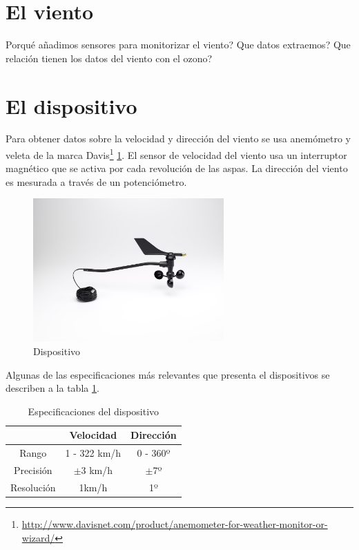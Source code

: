 \documentclass[a4paper, 11pt]{article}
\begin{document}
\section{El viento}
Porqué añadimos sensores para monitorizar el viento?
Que datos extraemos?
Que relación tienen los datos del viento con el ozono?

\newpage
\section{El dispositivo}
Para obtener datos sobre la velocidad y dirección del viento se usa anemómetro y veleta de la marca Davis\footnote{\url{http://www.davisnet.com/product/anemometer-for-weather-monitor-or-wizard/}} \ref{fig:gadget}. El sensor de velocidad del viento usa un interruptor magnético que se activa por cada revolución de las aspas. La dirección del viento es mesurada a través de un potenciómetro.

\begin{figure}[h]
	\center
	\includegraphics[width=0.65\textwidth]{img/davis.jpg}
	\caption{Dispositivo}
	\label{fig:gadget}
\end{figure}

Algunas de las especificaciones más relevantes que presenta el dispositivos se describen a la tabla 	\ref{tab:specifications}.

\begin{table}[h]
\center
\begin{tabular}{| c | c | c |}
\hline
& \textbf{Velocidad} & \textbf{Dirección} \\
\hline
Rango & 1 - 322 km/h & 0 - 360º \\
\hline
Precisión & $\pm$3 km/h & $\pm$7º \\
\hline
Resolución & 1km/h & 1º\\
\hline
\end{tabular}
\caption{Especificaciones del dispositivo}
\label{tab:specifications}
\end{table}
\end{document}
